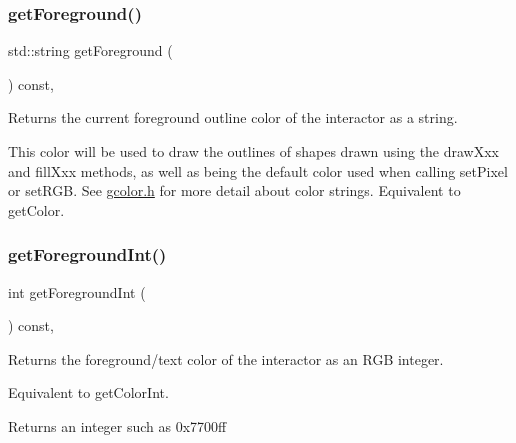 \subsubsection{\texorpdfstring{get\+Foreground()}{getForeground()}\hspace{0.1cm}{\footnotesize\ttfamily [2/2]}}
{\footnotesize\ttfamily std\+::string get\+Foreground (\begin{DoxyParamCaption}{ }\end{DoxyParamCaption}) const\hspace{0.3cm}{\ttfamily [virtual]}, {\ttfamily [inherited]}}



Returns the current foreground outline color of the interactor as a string. 

This color will be used to draw the outlines of shapes drawn using the draw\+Xxx and fill\+Xxx methods, as well as being the default color used when calling set\+Pixel or set\+R\+GB. See \mbox{\hyperlink{gcolor_8h_source}{gcolor.\+h}} for more detail about color strings. Equivalent to get\+Color. \mbox{\label{classsgl_1_1GInteractor_ac3b12ab385a6ef9ae90fc879860ba726}} 
\subsubsection{\texorpdfstring{get\+Foreground\+Int()}{getForegroundInt()}\hspace{0.1cm}{\footnotesize\ttfamily [1/2]}}
{\footnotesize\ttfamily int get\+Foreground\+Int (\begin{DoxyParamCaption}{ }\end{DoxyParamCaption}) const\hspace{0.3cm}{\ttfamily [virtual]}, {\ttfamily [inherited]}}



Returns the foreground/text color of the interactor as an R\+GB integer. 

Equivalent to get\+Color\+Int. \begin{DoxyReturn}{Returns}
an integer such as 0x7700ff 
\end{DoxyReturn}
\mbox{\label{classsgl_1_1GDrawingSurface_ac3b12ab385a6ef9ae90fc879860ba726}} 
